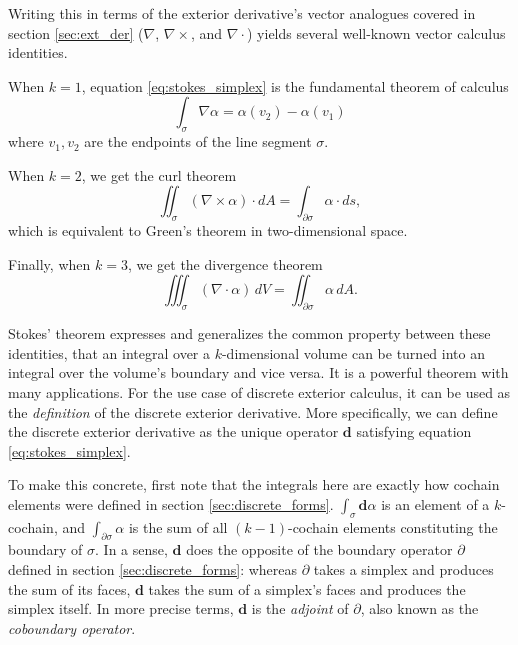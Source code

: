 \documentclass[utf8,english]{gradu3}
\begin{document}
Writing this in terms of the exterior derivative's
vector analogues covered in section \ref{sec:ext_der}
($\nabla$, $\nabla \times$, and $\nabla \cdot$)
yields several well-known vector calculus identities.

When $k = 1$, equation \ref{eq:stokes_simplex}
is the fundamental theorem of calculus
\begin{equation}\label{eq:fund_theorem_calc}
  \int_{\sigma} \nabla \alpha = \alpha(v_2) - \alpha(v_1)
\end{equation}
where $v_1,v_2$ are the endpoints of the line segment $\sigma$.

When $k = 2$, we get the curl theorem
\begin{equation}\label{eq:curl_theorem}
  \iint_{\sigma} (\nabla \times \alpha) \cdot dA = \int_{\partial\sigma} \alpha \cdot ds,
\end{equation}
which is equivalent to Green's theorem in two-dimensional space.

Finally, when $k = 3$, we get the divergence theorem
\begin{equation}\label{eq:divergence_theorem}
  \iiint_{\sigma} (\nabla \cdot \alpha) \,dV = \iint_{\partial\sigma} \alpha \,dA.
\end{equation}

Stokes' theorem expresses and generalizes the common property between these identities,
that an integral over a $k$-dimensional volume
can be turned into an integral over the volume's boundary and vice versa.
It is a powerful theorem with many applications.
For the use case of discrete exterior calculus,
it can be used as the \textit{definition} of
the discrete exterior derivative.
More specifically, we can define the discrete exterior derivative
as the unique operator $\mathbf{d}$ satisfying equation \ref{eq:stokes_simplex}.

To make this concrete, first note that the integrals here
are exactly how cochain elements were defined in section \ref{sec:discrete_forms}.
$\int_{\sigma} \mathbf{d}\alpha$ is an element of a $k$-cochain,
and $\int_{\partial\sigma} \alpha$ is the sum of all $(k-1)$-cochain elements
constituting the boundary of $\sigma$.
In a sense, $\mathbf{d}$ does the opposite of the boundary operator $\partial$
defined in section \ref{sec:discrete_forms}:
whereas $\partial$ takes a simplex and produces the sum of its faces,
$\mathbf{d}$ takes the sum of a simplex's faces and produces the simplex itself.
In more precise terms, $\mathbf{d}$ is the \textit{adjoint} of $\partial$,
also known as the \textit{coboundary operator}.
\end{document}
